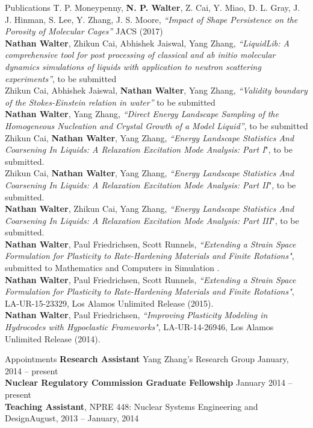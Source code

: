 \documentclass[9pt]{resume} %
\begin{document}
\begin{rSection}{Publications}
	T. P. Moneypenny, {\bf N. P. Walter}, Z. Cai, Y. Miao, D. L. Gray, J. J. Hinman, S. Lee, Y. Zhang, J. S. Moore, {\it { ``Impact of Shape Persistence on the Porosity of Molecular Cages''} } JACS (2017)
	\\[5pt]
	{\bf Nathan Walter}, Zhikun Cai, Abhishek Jaiswal, Yang Zhang, {\it ``LiquidLib: A comprehensive tool for post processing of classical and \textit{ab initio} molecular dynamics simulations of liquids with application to neutron scattering experiments''}, to be submitted
	\\[5pt]
	Zhikun Cai, Abhishek Jaiswal, {\bf Nathan Walter}, Yang Zhang, {\it ``Validity boundary of the Stokes-Einstein relation in water''} to be submitted
	\\[5pt]
	{\bf Nathan Walter}, Yang Zhang, {\it ``Direct Energy Landscape Sampling of the Homogeneous Nucleation and Crystal Growth of a Model Liquid''}, to be submitted
	\\[5pt]
	Zhikun Cai, {\bf Nathan Walter}, Yang Zhang, {\it ``Energy Landscape Statistics And Coarsening In Liquids: A Relaxation Excitation Mode Analysis: Part I}", to be submitted.
	\\[5pt]
	Zhikun Cai, {\bf Nathan Walter}, Yang Zhang, {\it ``Energy Landscape Statistics And Coarsening In Liquids: A Relaxation Excitation Mode Analysis: Part II}", to be submitted.
	\\[5pt]
	{\bf Nathan Walter}, Zhikun Cai, Yang Zhang, {\it ``Energy Landscape Statistics And Coarsening In Liquids: A Relaxation Excitation Mode Analysis: Part III}", to be submitted.
	\\[5pt]
	{ \bf Nathan Walter}, Paul Friedrichsen, Scott Runnels, {\it{``Extending a Strain Space Formulation for Plasticity to Rate-Hardening Materials and Finite Rotations"}}, submitted to Mathematics and Computers in Simulation .
	\\[5pt]
	{ \bf Nathan Walter}, Paul Friedrichsen, Scott Runnels, {\it{``Extending a Strain Space Formulation for Plasticity to Rate-Hardening Materials and Finite Rotations"}}, LA-UR-15-23329, Los Alamos Unlimited Release (2015).
	\\[5pt]
	{ \bf Nathan Walter}, Paul Friedrichsen, {\it{``Improving Plasticity Modeling in Hydrocodes with Hypoelastic Frameworks"}}, LA-UR-14-26946, Los Alamos Unlimited Release (2014).
	\\	
\end{rSection}

\begin{rSection}{Appointments}
	{\bf Research Assistant} Yang Zhang's Research Group \hfill {January, 2014 -- present} 
	\\
	{\bf Nuclear Regulatory Commission Graduate Fellowship} \hfill {January 2014 -- present}
	\\
	{\bf Teaching Assistant}, NPRE 448: Nuclear Systems Engineering and Design\hfill {August, 2013 -- January, 2014}
\end{rSection}
\end{document}
